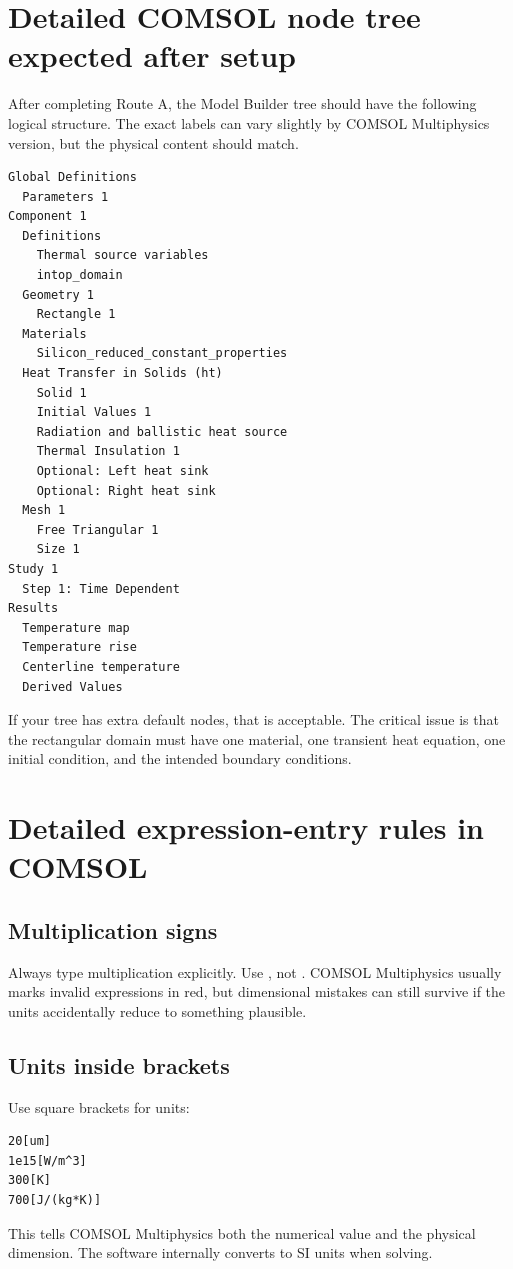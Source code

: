 \documentclass[11pt]{article}
\newcommand{\COMSOL}{COMSOL Multiphysics}
\newcommand{\comsol}{\COMSOL}
\newcommand{\type}[1]{\texttt{\detokenize{#1}}}
\begin{document}
\section{Detailed COMSOL node tree expected after setup}

After completing Route A, the Model Builder tree should have the following logical structure.  The exact labels can vary slightly by \comsol{} version, but the physical content should match.
\begin{lstlisting}
Global Definitions
  Parameters 1
Component 1
  Definitions
    Thermal source variables
    intop_domain
  Geometry 1
    Rectangle 1
  Materials
    Silicon_reduced_constant_properties
  Heat Transfer in Solids (ht)
    Solid 1
    Initial Values 1
    Radiation and ballistic heat source
    Thermal Insulation 1
    Optional: Left heat sink
    Optional: Right heat sink
  Mesh 1
    Free Triangular 1
    Size 1
Study 1
  Step 1: Time Dependent
Results
  Temperature map
  Temperature rise
  Centerline temperature
  Derived Values
\end{lstlisting}

If your tree has extra default nodes, that is acceptable.  The critical issue is that the rectangular domain must have one material, one transient heat equation, one initial condition, and the intended boundary conditions.

\section{Detailed expression-entry rules in COMSOL}

\subsection{Multiplication signs}
Always type multiplication explicitly.  Use \type{rhoSi*CpSi}, not \type{rhoSi CpSi}.  \comsol{} usually marks invalid expressions in red, but dimensional mistakes can still survive if the units accidentally reduce to something plausible.

\subsection{Units inside brackets}
Use square brackets for units:
\begin{lstlisting}
20[um]
1e15[W/m^3]
300[K]
700[J/(kg*K)]
\end{lstlisting}
This tells \comsol{} both the numerical value and the physical dimension.  The software internally converts to SI units when solving.
\end{document}

